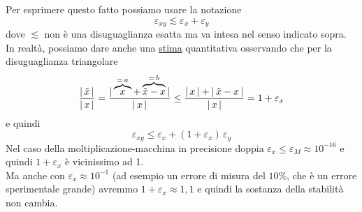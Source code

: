 \documentclass[12pt]{article}
\begin{document}
Per esprimere questo fatto possiamo usare la notazione \[\varepsilon_{xy} \lesssim \varepsilon_x + \varepsilon_y \]
dove $\lesssim$ non è una disuguaglianza esatta ma va intesa nel senso indicato sopra. \\
In realtà, possiamo dare anche una \uline{stima} quantitativa osservando che per la disuguaglianza triangolare 
\[ \frac{\lvert \,\Tilde{x}\, \rvert}{\lvert \,x\, \rvert} = \frac{\lvert \, \overbrace{x}^{=\,a} + \overbrace{\Tilde{x} - x}^{=\,b} \, \rvert}{\lvert\, x \, \rvert} \le \frac{\lvert \, x \, \rvert + \lvert \,\Tilde{x} - x\, \rvert}{\lvert\, x \, \rvert} = 1 + \varepsilon_x\]
e quindi \[ \varepsilon_{xy} \le \varepsilon_x + (1 + \varepsilon_x)\,\varepsilon_y\]
Nel caso della moltiplicazione-macchina in precisione doppia $\varepsilon_x \le \varepsilon_M \approx 10^{-16}$ e quindi $1 + \varepsilon_x$ è vicinissimo ad 1.\\
Ma anche con $\varepsilon_x \approx 10^{-1}$ (ad esempio un errore di misura del $10\%$, che è un errore sperimentale grande) avremmo $1 + \varepsilon_x \approx 1,1$ e quindi la sostanza della stabilità non cambia.
\end{document}
